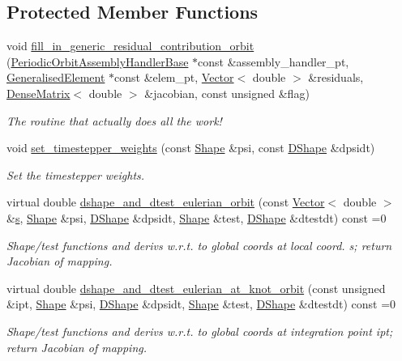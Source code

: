 \subsection*{Protected Member Functions}
\begin{DoxyCompactItemize}
\item 
void \hyperlink{classoomph_1_1PeriodicOrbitEquations_a8601a20947d15aa0c1f55ee0b654b71f}{fill\+\_\+in\+\_\+generic\+\_\+residual\+\_\+contribution\+\_\+orbit} (\hyperlink{classoomph_1_1PeriodicOrbitAssemblyHandlerBase}{Periodic\+Orbit\+Assembly\+Handler\+Base} $\ast$const \&assembly\+\_\+handler\+\_\+pt, \hyperlink{classoomph_1_1GeneralisedElement}{Generalised\+Element} $\ast$const \&elem\+\_\+pt, \hyperlink{classoomph_1_1Vector}{Vector}$<$ double $>$ \&residuals, \hyperlink{classoomph_1_1DenseMatrix}{Dense\+Matrix}$<$ double $>$ \&jacobian, const unsigned \&flag)
\begin{DoxyCompactList}\small\item\em The routine that actually does all the work! \end{DoxyCompactList}\item 
void \hyperlink{classoomph_1_1PeriodicOrbitEquations_a253f5b0748b61c8f68d030b861ccd025}{set\+\_\+timestepper\+\_\+weights} (const \hyperlink{classoomph_1_1Shape}{Shape} \&psi, const \hyperlink{classoomph_1_1DShape}{D\+Shape} \&dpsidt)
\begin{DoxyCompactList}\small\item\em Set the timestepper weights. \end{DoxyCompactList}\item 
virtual double \hyperlink{classoomph_1_1PeriodicOrbitEquations_a745c25bf4dc333322bc9b4c1841ec11e}{dshape\+\_\+and\+\_\+dtest\+\_\+eulerian\+\_\+orbit} (const \hyperlink{classoomph_1_1Vector}{Vector}$<$ double $>$ \&\hyperlink{cfortran_8h_ab7123126e4885ef647dd9c6e3807a21c}{s}, \hyperlink{classoomph_1_1Shape}{Shape} \&psi, \hyperlink{classoomph_1_1DShape}{D\+Shape} \&dpsidt, \hyperlink{classoomph_1_1Shape}{Shape} \&test, \hyperlink{classoomph_1_1DShape}{D\+Shape} \&dtestdt) const =0
\begin{DoxyCompactList}\small\item\em Shape/test functions and derivs w.\+r.\+t. to global coords at local coord. s; return Jacobian of mapping. \end{DoxyCompactList}\item 
virtual double \hyperlink{classoomph_1_1PeriodicOrbitEquations_a2bf0f39d52d1416242a7f618c2ece5ca}{dshape\+\_\+and\+\_\+dtest\+\_\+eulerian\+\_\+at\+\_\+knot\+\_\+orbit} (const unsigned \&ipt, \hyperlink{classoomph_1_1Shape}{Shape} \&psi, \hyperlink{classoomph_1_1DShape}{D\+Shape} \&dpsidt, \hyperlink{classoomph_1_1Shape}{Shape} \&test, \hyperlink{classoomph_1_1DShape}{D\+Shape} \&dtestdt) const =0
\begin{DoxyCompactList}\small\item\em Shape/test functions and derivs w.\+r.\+t. to global coords at integration point ipt; return Jacobian of mapping. \end{DoxyCompactList}\end{DoxyCompactItemize}
